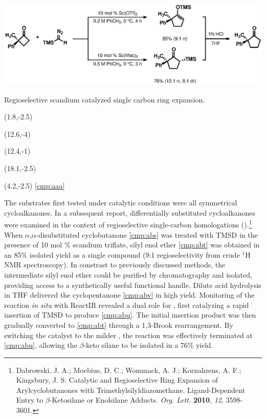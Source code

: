 \begin{Scheme}[b]
  \centering
  \includegraphics[scale=0.8]{chp_diazobkg/images/kingsburysingle}
  \caption{Regioselective scandium catalyzed single carbon ring expansion.}
  \begin{textblock}{1}(1.8,-2.5)  \end{textblock}
 \begin{textblock}{1}(12.6,-4)  \end{textblock}
 \begin{textblock}{1}(12.4,-1)  \end{textblock}
 \begin{textblock}{1}(18.1,-2.5)  \end{textblock}
  \begin{textblock}{1}(4.2,-2.5) \textsf{\scriptsize{\ref{cmp:aaa}}}
  \end{textblock}
  \label{sch:kingsburysingle}
\end{Scheme}
The substrates first
tested under catalytic conditions were all symmetrical cycloalkanones. In a subsequent report,
differentially substituted cycloalkanones were examined in the context of regioselective single-carbon homologations ().\footnote{{\frenchspacing Dabrowski, J.
A.; Moebius, D.
C.; Wommack, A. J.; Kornahrens, A. F.; Kingsbury, J. S. Catalytic and Regioselective Ring Expansion
of Arylcyclobutanones with Trimethylsilyldiazomethane. Ligand-Dependent Entry to $\beta$-Ketosilane
or Enolsilane Adducts. \textit{Org. Lett.} \textbf{2010}, \textit{12}, 3598-3601.}} When
$\alpha$,$\alpha$-disubstituted cyclobutanone \ref{cmp:abs} was treated with TMSD in the presence of
10 mol \% scandium triflate, silyl enol ether \ref{cmp:abt} was obtained in an 85\% isolated yield as a single compound (9:1
regioselectivity from crude $^1$H NMR spectroscopy). In constrast to previously discussed methods,
the intermediate silyl enol ether could be purified by chromatography and isolated, providing access
to a synthetically useful functional handle. Dilute acid hydrolysis in THF delivered the
cyclopentanone \ref{cmp:abv} in high yield.
 Monitoring of the reaction \textit{in situ} with ReactIR
revealed a dual role for , first catalyzing a rapid insertion of TMSD to produce
\ref{cmp:abu}. The initial insertion product was then gradually converted to \ref{cmp:abt} through
a 1,3-Brook rearrangement.
By switching the catalyst to the milder , the reaction was effectively terminated at
\ref{cmp:abu}, allowing the $\beta$-keto silane to be isolated in a 76\% yield. 
 
